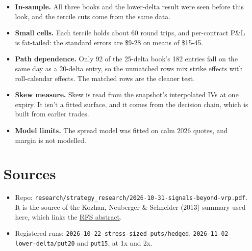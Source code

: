 \documentclass{article}
\begin{document}
\begin{itemize}

\item \textbf{In-sample.} All three books and the lower-delta result were seen before this look, and the tercile cuts come from the same data.

\item \textbf{Small cells.} Each tercile holds about 60 round trips, and per-contract P\&L is fat-tailed: the standard errors are \$9-28 on means of \$15-45.

\item \textbf{Path dependence.} Only 92 of the 25-delta book's 182 entries fall on the same day as a 20-delta entry, so the unmatched rows mix strike effects with roll-calendar effects. The matched rows are the cleaner test.

\item \textbf{Skew measure.} Skew is read from the snapshot's interpolated IVs at one expiry. It isn't a fitted surface, and it comes from the decision chain, which is built from earlier trades.

\item \textbf{Model limits.} The spread model was fitted on calm 2026 quotes, and margin is not modelled.

\end{itemize}

\section{Sources}

\begin{itemize}

\item Repo: \texttt{research/\allowbreak{}strategy\_\allowbreak{}research/\allowbreak{}2026-\allowbreak{}10-\allowbreak{}31-\allowbreak{}signals-\allowbreak{}beyond-\allowbreak{}vrp.\allowbreak{}pdf}. It is the source of the Kozhan, Neuberger \& Schneider (2013) summary used here, which links the \href{https://ideas.repec.org/a/oup/rfinst/v26y2013i9p2174-2203.html}{RFS abstract}.

\item Registered runs: \texttt{2026-\allowbreak{}10-\allowbreak{}22-\allowbreak{}stress-\allowbreak{}sized-\allowbreak{}puts/\allowbreak{}hedged}, \texttt{2026-\allowbreak{}11-\allowbreak{}02-\allowbreak{}lower-\allowbreak{}delta/\allowbreak{}put20} and \texttt{put15}, at 1x and 2x.

\end{itemize}
\end{document}
